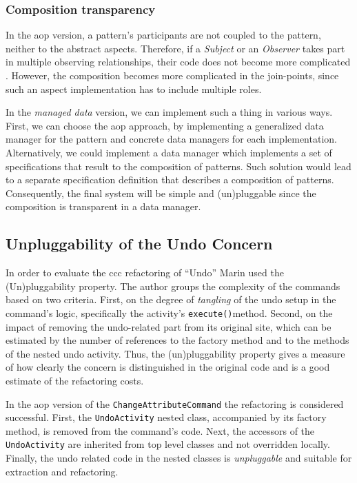 \subsubsection{Composition transparency}
In the \ac{aop} version, a pattern's participants are not coupled to the pattern, neither to the abstract aspects.
Therefore, if a \textit{Subject} or an \textit{Observer} takes part in multiple observing relationships, their code does not become more complicated \cite{hannemann2005role}.
However, the composition becomes more complicated in the join-points, since such an aspect implementation has to include multiple roles.

In the \textit{managed data} version, we can implement such a thing in various ways.
First, we can choose the \ac{aop} approach, by implementing a generalized data manager for the pattern and concrete data managers for each implementation.
Alternatively, we could implement a data manager which implements a set of specifications that result to the composition of patterns.
Such solution would lead to a separate specification definition that describes a composition of patterns.
Consequently, the final system will be simple and (un)pluggable since the composition is transparent in a data manager.

\subsection{Unpluggability of the Undo Concern}
In order to evaluate the \ac{ccc} refactoring of ``Undo'' Marin \cite{marin2004refactoring} used the (Un)pluggability property. 
The author groups the complexity of the commands based on two criteria.
First, on the degree of \textit{tangling} of the undo setup in the command's logic, specifically the activity's \texttt{execute()}method. 
Second, on the impact of removing the undo-related part from its original site, which can be estimated by the number of references to the factory method and to the methods of the nested undo activity.
Thus, the (un)pluggability property gives a measure of how clearly the concern is distinguished in the original code and is a good estimate of the refactoring costs.

In the \ac{aop} version of the \texttt{ChangeAttributeCommand} the refactoring is considered successful.
First, the \texttt{UndoActivity} nested class, accompanied by its factory method, is removed from the command's code.
Next, the accessors of the \texttt{UndoActivity} are inherited from top level classes and not overridden locally.
Finally, the undo related code in the nested classes is \textit{unpluggable} and suitable for extraction and refactoring.

